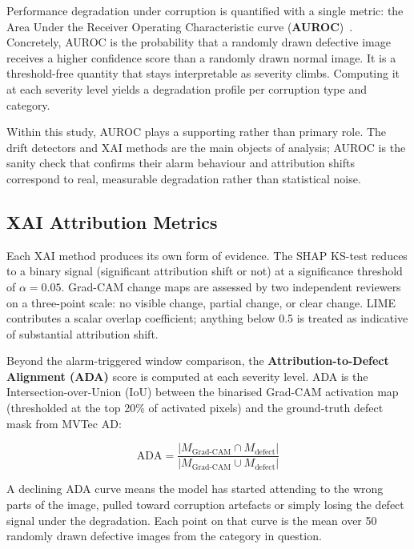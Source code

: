 Performance degradation under corruption is quantified with a single metric: the Area Under the Receiver Operating Characteristic curve (\textbf{AUROC})~\autocite{Fawcett2006}. Concretely, AUROC is the probability that a randomly drawn defective image receives a higher confidence score than a randomly drawn normal image. It is a threshold-free quantity that stays interpretable as severity climbs. Computing it at each severity level yields a degradation profile per corruption type and category.

Within this study, AUROC plays a supporting rather than primary role. The drift detectors and XAI methods are the main objects of analysis; AUROC is the sanity check that confirms their alarm behaviour and attribution shifts correspond to real, measurable degradation rather than statistical noise.

\subsection{XAI Attribution Metrics}
\label{sec:xai-metrics}

Each XAI method produces its own form of evidence. The SHAP KS-test reduces to a binary signal (significant attribution shift or not) at a significance threshold of $\alpha = 0.05$. Grad-CAM change maps are assessed by two independent reviewers on a three-point scale: no visible change, partial change, or clear change. LIME contributes a scalar overlap coefficient; anything below 0.5 is treated as indicative of substantial attribution shift.

Beyond the alarm-triggered window comparison, the \textbf{Attribution-to-Defect Alignment (ADA)} score is computed at each severity level. ADA is the Intersection-over-Union (IoU) between the binarised Grad-CAM activation map (thresholded at the top 20\% of activated pixels) and the ground-truth defect mask from MVTec AD:

\[
  \text{ADA} = \frac{|M_{\text{Grad-CAM}} \cap M_{\text{defect}}|}{|M_{\text{Grad-CAM}} \cup M_{\text{defect}}|}
\]

A declining ADA curve means the model has started attending to the wrong parts of the image, pulled toward corruption artefacts or simply losing the defect signal under the degradation. Each point on that curve is the mean over 50 randomly drawn defective images from the category in question.
